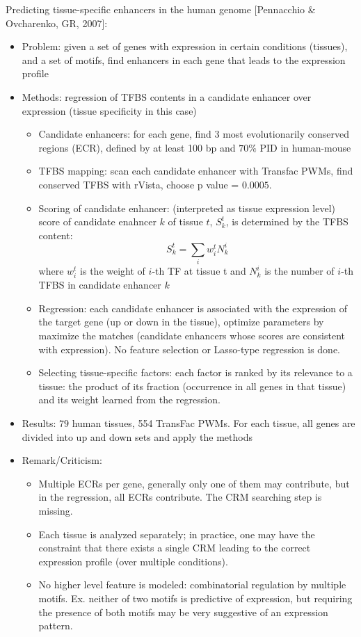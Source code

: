 \documentclass{report}
\begin{document}
\begin{enumerate}
	Predicting tissue-specific enhancers in the human genome [Pennacchio \& Ovcharenko, GR, 2007]:
	\begin{itemize}
		\item Problem: given a set of genes with expression in certain conditions (tissues), and a set of motifs, find enhancers in each gene that leads to the expression profile
		
		\item Methods: regression of TFBS contents in a candidate enhancer over expression (tissue specificity in this case)
		\begin{itemize}
			\item Candidate enhancers: for each gene, find 3 most evolutionarily conserved regions (ECR), defined by at least 100 bp and $70\%$ PID in human-mouse
			\item TFBS mapping: scan each candidate enhancer with Transfac PWMs, find conserved TFBS with rVista, choose p value = $0.0005$. 
			\item Scoring of candidate enhancer: (interpreted as tissue expression level) score of candidate enahncer $k$ of tissue $t$, $S_k^t$, is determined by the TFBS content: 
			\begin{equation}
			S_k^t = \sum_{i}{w_i^t N_k^i}
			\end{equation}
			where $w_i^t$ is the weight of $i$-th TF at tissue t and $N_k^i$ is the number of $i$-th TFBS in candidate enhancer $k$
			\item Regression: each candidate enhancer is associated with the expression of the target gene (up or down in the tissue), optimize parameters by maximize the matches (candidate enhancers whose scores are consistent with expression). No feature selection or Lasso-type regression is done. 
			\item Selecting tissue-specific factors: each factor is ranked by its relevance to a tissue: the product of its fraction (occurrence in all genes in that tissue) and its weight learned from the regression. 
		\end{itemize}
		
		\item Results: $79$ human tissues, 554 TransFac PWMs. For each tissue, all genes are divided into up and down sets and apply the methods
		
		\item Remark/Criticism:
		\begin{itemize}
			\item Multiple ECRs per gene, generally only one of them may contribute, but in the regression, all ECRs contribute. The CRM searching step is missing.
			\item Each tissue is analyzed separately; in practice, one may have the constraint that there exists a single CRM leading to the correct expression profile (over multiple conditions).
			\item No higher level feature is modeled: combinatorial regulation by multiple motifs. Ex. neither of two motifs is predictive of expression, but requiring the presence of both motifs may be very suggestive of an expression pattern. 
		\end{itemize}
	\end{itemize}
	

\end{enumerate}
\end{document}
